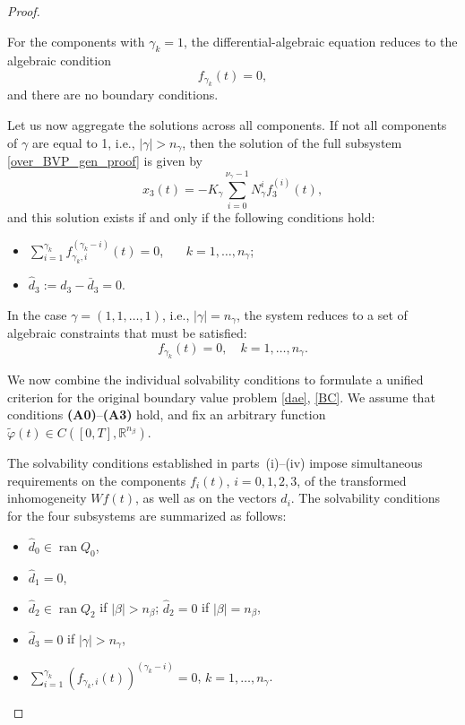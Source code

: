 \documentclass[preprint,12pt]{elsarticle}
\numberwithin{equation}{section}
\theoremstyle{definition}
\begin{document}
\begin{proof}
\begin{itemize}
For the components with $\gamma_k = 1$, the differential-algebraic equation reduces to the algebraic condition
\begin{equation*}\label{f_gamma1_cond}
    f_{\gamma_k}(t) = 0,
\end{equation*}
and there are no boundary conditions.

Let us now  aggregate the solutions across all components. If not all components of $\gamma$ are equal to 1, i.e., $|\gamma|>n_\gamma$, then the solution of the full subsystem \eqref{over_BVP_gen_proof} is given by
\begin{equation}\label{sol_x3_genBVP}
    x_3(t) = -K_{\gamma}\sum\limits_{i=0}^{\nu_\gamma-1}N_{\gamma}^i f_3^{(i)}(t),
\end{equation}
and this solution exists if and only if the following conditions hold:
\begin{itemize}
        \item[($\text{a}''$)] $\sum\limits_{i=1}^{\gamma_k}f_{\gamma_k,i}^{(\gamma_k-i)}(t)=0$, ~~~$k=1,\ldots,n_{\gamma}$;
         \item[($\text{b}''$)] $\widehat{d}_3:=d_3-\bar{d}_3=0.$
\end{itemize}
        
        In the case \( \gamma = (1, 1, \ldots, 1) \), i.e., \( |\gamma| = n_\gamma \), the system reduces to a set of algebraic constraints that must be satisfied:
\begin{equation*}
    f_{\gamma_k}(t) = 0, \quad k = 1, \ldots, n_\gamma.
\end{equation*}
\end{itemize}

We now combine the individual solvability conditions to formulate a unified criterion for the original boundary value problem \eqref{dae}, \eqref{BC}. We assume that conditions \textnormal{\textbf{(A0)}--\textbf{(A3)}} hold, and fix an arbitrary function $\widetilde{\varphi}(t) \in C([0,T], \mathbb{R}^{n_\beta})$.

The solvability conditions established in parts~(i)–(iv) impose simultaneous requirements on the components $f_i(t)$, $i=0,1,2,3$, of the transformed inhomogeneity $Wf(t)$, as well as on the vectors $\widehat{d}_i$.
The solvability conditions for the four subsystems are summarized as follows:
\begin{itemize}
    \item[(i)] \( \widehat{d}_0 \in  \operatorname{ran} Q_0\),
    \item[(ii)] \( \widehat{d}_1 = 0 \),
    \item[(iii)] \( \widehat{d}_2 \in  \operatorname{ran } Q_2 \) if \( |\beta| > n_\beta \); \quad \( \widehat{d}_2 = 0 \) if \( |\beta| = n_\beta \),
    \item[(iv.1)] \( \widehat{d}_3 = 0 \) if \( |\gamma| > n_\gamma \), 
    \item[(iv.2)] \( \sum\limits_{i=1}^{\gamma_k} \left( f_{\gamma_k,i}(t) \right)^{(\gamma_k - i)} = 0 \), \quad \( k = 1, \ldots, n_\gamma \).
\end{itemize}



\end{proof}
\end{document}
